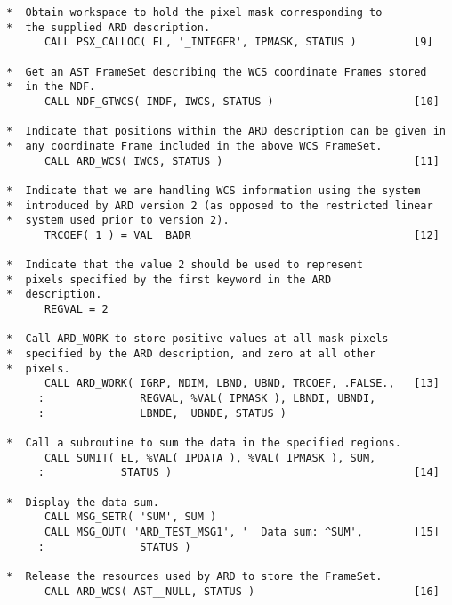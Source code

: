 \begin{verbatim}
*  Obtain workspace to hold the pixel mask corresponding to   
*  the supplied ARD description.                              
      CALL PSX_CALLOC( EL, '_INTEGER', IPMASK, STATUS )         [9]

*  Get an AST FrameSet describing the WCS coordinate Frames stored
*  in the NDF.
      CALL NDF_GTWCS( INDF, IWCS, STATUS )                      [10]

*  Indicate that positions within the ARD description can be given in
*  any coordinate Frame included in the above WCS FrameSet.
      CALL ARD_WCS( IWCS, STATUS )                              [11]

*  Indicate that we are handling WCS information using the system 
*  introduced by ARD version 2 (as opposed to the restricted linear
*  system used prior to version 2).
      TRCOEF( 1 ) = VAL__BADR                                   [12]
                                                              
*  Indicate that the value 2 should be used to represent      
*  pixels specified by the first keyword in the ARD           
*  description.                                               
      REGVAL = 2                                              
                                                              
*  Call ARD_WORK to store positive values at all mask pixels  
*  specified by the ARD description, and zero at all other    
*  pixels.                                                    
      CALL ARD_WORK( IGRP, NDIM, LBND, UBND, TRCOEF, .FALSE.,   [13]
     :               REGVAL, %VAL( IPMASK ), LBNDI, UBNDI,    
     :               LBNDE,  UBNDE, STATUS )                  
                                                              
*  Call a subroutine to sum the data in the specified regions.
      CALL SUMIT( EL, %VAL( IPDATA ), %VAL( IPMASK ), SUM,    
     :            STATUS )                                      [14]
                                                              
*  Display the data sum.                                      
      CALL MSG_SETR( 'SUM', SUM )                             
      CALL MSG_OUT( 'ARD_TEST_MSG1', '  Data sum: ^SUM',        [15]
     :               STATUS )                                 
                                                              
*  Release the resources used by ARD to store the FrameSet.
      CALL ARD_WCS( AST__NULL, STATUS )                         [16]


\end{verbatim}
